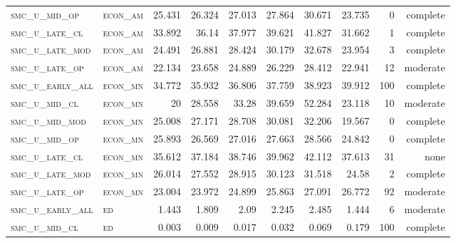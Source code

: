 \begin{landscape}
\begin{center}
\begin{footnotesize}
\begin{longtable}{llrrrrr|rrr}
\textsc{smc\_u\_mid\_op   } & \textsc{econ\_am  }   & 25.431   & 26.324   & 27.013   & 27.864   & 30.671   & 23.735        & 0             & complete            \\
\textsc{smc\_u\_late\_cl  } & \textsc{econ\_am  }   & 33.892   & 36.14    & 37.977   & 39.621   & 41.827   & 31.662        & 1             & complete        \\
\textsc{smc\_u\_late\_mod } & \textsc{econ\_am  }   & 24.491   & 26.881   & 28.424   & 30.179   & 32.678   & 23.954        & 3             & complete        \\
\textsc{smc\_u\_late\_op  } & \textsc{econ\_am  }   & 22.134   & 23.658   & 24.889   & 26.229   & 28.412   & 22.941        & 12            & moderate        \\
\textsc{smc\_u\_early\_all} & \textsc{econ\_mn  }   & 34.772   & 35.932   & 36.806   & 37.759   & 38.923   & 39.912        & 100           & complete        \\
\textsc{smc\_u\_mid\_cl   } & \textsc{econ\_mn  }   & 20       & 28.558   & 33.28    & 39.659   & 52.284   & 23.118        & 10            & moderate        \\
\textsc{smc\_u\_mid\_mod  } & \textsc{econ\_mn  }   & 25.008   & 27.171   & 28.708   & 30.081   & 32.206   & 19.567        & 0             & complete            \\
\textsc{smc\_u\_mid\_op   } & \textsc{econ\_mn  }   & 25.893   & 26.569   & 27.016   & 27.663   & 28.566   & 24.842        & 0             & complete            \\
\textsc{smc\_u\_late\_cl  } & \textsc{econ\_mn  }   & 35.612   & 37.184   & 38.746   & 39.962   & 42.112   & 37.613        & 31            & none        \\
\textsc{smc\_u\_late\_mod } & \textsc{econ\_mn  }   & 26.014   & 27.552   & 28.915   & 30.123   & 31.518   & 24.58         & 2             & complete        \\
\textsc{smc\_u\_late\_op  } & \textsc{econ\_mn  }   & 23.004   & 23.972   & 24.899   & 25.863   & 27.091   & 26.772        & 92            & moderate        \\
\textsc{smc\_u\_early\_all} & \textsc{ed        }   & 1.443    & 1.809    & 2.09     & 2.245    & 2.485    & 1.444         & 6             & moderate        \\
\textsc{smc\_u\_mid\_cl   } & \textsc{ed        }   & 0.003    & 0.009    & 0.017    & 0.032    & 0.069    & 0.179         & 100           & complete        \\

\end{longtable}
\end{footnotesize}
\end{center}
\end{landscape}
